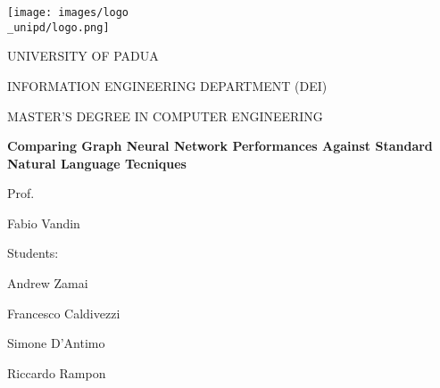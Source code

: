 \begin{titlepage}
    \begin{center}
        \texttt{[image: images/logo\\\_unipd/logo.png]}
        
        \vspace*{1cm}
        \Large
        \textmd{UNIVERSITY OF PADUA}
        
        \vspace*{1cm}
        \large
        \textmd{INFORMATION ENGINEERING DEPARTMENT (DEI)}
                
        \vspace*{0.5cm}
        \large
        \textmd{MASTER'S DEGREE IN COMPUTER ENGINEERING} 
                
        \vspace*{1cm}
        \Huge
        \textbf{Comparing Graph Neural Network Performances Against Standard Natural Language Tecniques}
        
        
        \raggedright
        \vspace*{1cm}
        \large
        \textmd{Prof.}
        
        \textmd{Fabio Vandin}
        
        \raggedleft
        \vspace*{0.5cm}
        \large
        \textmd{Students:}
        
        \textmd{Andrew Zamai}
        
        \textmd{Francesco Caldivezzi}       
        
        \textmd{Simone D'Antimo}        
        
        \textmd{Riccardo Rampon}
        
    \end{center}
\end{titlepage}